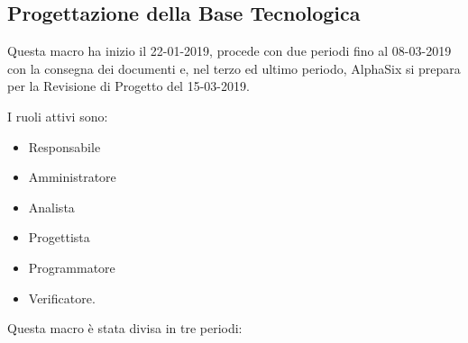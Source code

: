 		\newpage
		
        \subsection{Progettazione della Base Tecnologica}
        Questa macro ha inizio il 22-01-2019, procede con due periodi fino al 08-03-2019 con la consegna dei documenti e, nel terzo ed ultimo periodo, AlphaSix si prepara per la Revisione di Progetto del 15-03-2019.
        
        I ruoli attivi sono: 
        \begin{itemize}
            \item Responsabile
            \item Amministratore
            \item Analista
            \item Progettista
            \item Programmatore
            \item Verificatore.
        \end{itemize}
        Questa macro è stata divisa in tre periodi:
